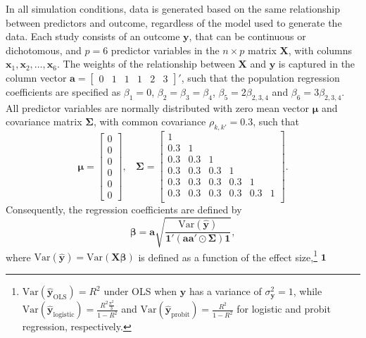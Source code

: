 \documentclass[
]{article}
\begin{document}
In all simulation conditions, data is generated based on the same
relationship between predictors and outcome, regardless of the model
used to generate the data. Each study consists of an outcome
\(\boldsymbol{y}\), that can be continuous or dichotomous, and \(p = 6\)
predictor variables in the \(n \times p\) matrix \(\boldsymbol{X}\),
with columns
\(\boldsymbol{x}_1, \boldsymbol{x}_2, \dots, \boldsymbol{x}_6\). The
weights of the relationship between \(\boldsymbol{X}\) and
\(\boldsymbol{y}\) is captured in the column vector
\(\boldsymbol{a} = \begin{bmatrix} 0 & 1 & 1 & 1 & 2 & 3 \end{bmatrix}'\),
such that the population regression coefficients are specified as
\(\beta_1 = 0\), \(\beta_2 = \beta_3 = \beta_4\),
\(\beta_5 = 2\beta_{2,3,4}\) and \(\beta_6 = 3\beta_{2,3,4}\). All
predictor variables are normally distributed with zero mean vector
\(\boldsymbol{\mu}\) and covariance matrix \(\boldsymbol{\Sigma}\), with
common covariance \(\rho_{k,k'}=0.3\), such that \[
\boldsymbol{\mu} = 
\begin{bmatrix}
0 \\ 0 \\ 0 \\ 0 \\ 0 \\ 0
\end{bmatrix}, 
~~~~
\boldsymbol{\Sigma} = 
\begin{bmatrix}
1 &  &  &  &  &  \\ 
0.3 & 1 &  &  &  &  \\ 
0.3 & 0.3 & 1 &  &  &  \\ 
0.3 & 0.3 & 0.3 & 1 &  &  \\ 
0.3 & 0.3 & 0.3 & 0.3 & 1 &  \\ 
0.3 & 0.3 & 0.3 & 0.3 & 0.3 & 1  \\ 
\end{bmatrix}.
\] Consequently, the regression coefficients are defined by \[
\boldsymbol{\beta} = \boldsymbol{a} 
  \sqrt{
    \frac{\text{Var}(\boldsymbol{\hat{y}})}{\boldsymbol{1'}(\boldsymbol{a} \boldsymbol{a'}\odot\boldsymbol{\Sigma})\boldsymbol{1}}
  },
\] where
\(\text{Var}(\boldsymbol{\hat{y}}) = \text{Var}(\boldsymbol{X\beta})\)
is defined as a function of the effect size,\footnote{
  \(\text{Var}(\boldsymbol{\hat{y}}_{\text{OLS}}) = R^2\) under OLS when
  \(\boldsymbol{y}\) has a variance of
  \(\sigma_{\boldsymbol{y}}^2 = 1\), while
  \(\text{Var}(\boldsymbol{\hat{y}}_{\text{logistic}}) = \frac{R^2\frac{\pi^2}{3}}{1 - R^2}\)
  and
  \(\text{Var}(\boldsymbol{\hat{y}}_{\text{probit}}) = \frac{R^2}{1-R^2}\)
  for logistic and probit regression, respectively.} \(\boldsymbol{1}\)
\end{document}
